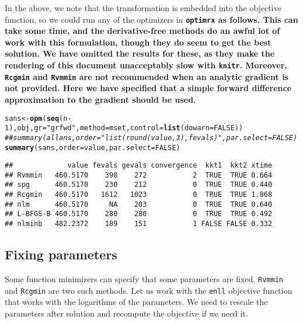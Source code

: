 \documentclass[11pt]{article}\usepackage[]{graphicx}\usepackage[]{color}
\makeatletter
\newcommand{\hlnum}[1]{\textcolor[rgb]{0.686,0.059,0.569}{#1}}%
\newcommand{\hlstr}[1]{\textcolor[rgb]{0.192,0.494,0.8}{#1}}%
\newcommand{\hlcom}[1]{\textcolor[rgb]{0.678,0.584,0.686}{\textit{#1}}}%
\newcommand{\hlopt}[1]{\textcolor[rgb]{0,0,0}{#1}}%
\newcommand{\hlstd}[1]{\textcolor[rgb]{0.345,0.345,0.345}{#1}}%
\newcommand{\hlkwb}[1]{\textcolor[rgb]{0.69,0.353,0.396}{#1}}%
\newcommand{\hlkwc}[1]{\textcolor[rgb]{0.333,0.667,0.333}{#1}}%
\newcommand{\hlkwd}[1]{\textcolor[rgb]{0.737,0.353,0.396}{\textbf{#1}}}%
\newenvironment{kframe}{%
 \def\at@end@of@kframe{}%
 \ifinner\ifhmode%
  \def\at@end@of@kframe{\end{minipage}}%
  \begin{minipage}{\columnwidth}%
 \fi\fi%
 \def\FrameCommand##1{\hskip\@totalleftmargin \hskip-\fboxsep
 \colorbox{shadecolor}{##1}\hskip-\fboxsep
     \hskip-\linewidth \hskip-\@totalleftmargin \hskip\columnwidth}%
 \MakeFramed {\advance\hsize-\width
   \@totalleftmargin\z@ \linewidth\hsize
   \@setminipage}}%
 {\par\unskip\endMakeFramed%
 \at@end@of@kframe}
\newenvironment{knitrout}{}{} %
\newcommand{\code}[1]{{\tt#1}}
\newcommand{\pkg}[1]{\bf{\tt#1}\rm }
\makeatother
\begin{document}
In the above, we note that the transformation is embedded into the objective function, 
so we could run any of the optimizers in \pkg{optimrx} as follows. This can take some time, 
and the derivative-free
methods do an awful lot of work with this formulation, though they do seem to get the
best solution. We have omitted the results for these, as they make the rendering of
this document unacceptably slow with \code{knitr}. Moreover, \code{Rcgmin}
and \code{Rvmmin} are not recommended when an analytic gradient is not provided. Here
we have specified that a simple forward difference approximation to the gradient
should be used. 

\begin{knitrout}\scriptsize
{}\color{fgcolor}\begin{kframe}
\begin{alltt}
\hlstd{sans}\hlkwb{<-} \hlkwd{opm}\hlstd{(}\hlkwd{seq}\hlstd{(n}\hlopt{-}\hlnum{1}\hlstd{), obj,} \hlkwc{gr}\hlstd{=}\hlstr{"grfwd"}\hlstd{,} \hlkwc{method}\hlstd{=mset,} \hlkwc{control}\hlstd{=}\hlkwd{list}\hlstd{(}\hlkwc{dowarn}\hlstd{=}\hlnum{FALSE}\hlstd{))}
\hlcom{## summary(allans, order = "list(round(value, 3), fevals)", par.select = FALSE)}
\hlkwd{summary}\hlstd{(sans,} \hlkwc{order} \hlstd{= value,} \hlkwc{par.select} \hlstd{=} \hlnum{FALSE}\hlstd{)}
\end{alltt}
\begin{verbatim}
##             value fevals gevals convergence  kkt1  kkt2 xtime
## Rvmmin   460.5170    398    272           2  TRUE  TRUE 0.664
## spg      460.5170    230    212           0  TRUE  TRUE 0.440
## Rcgmin   460.5170   1612   1023           0  TRUE  TRUE 1.868
## nlm      460.5170     NA    203           0  TRUE  TRUE 0.640
## L-BFGS-B 460.5170    280    280           0  TRUE  TRUE 0.492
## nlminb   482.2372    189    151           1 FALSE FALSE 0.332
\end{verbatim}
\end{kframe}
\end{knitrout}

\subsection{Fixing parameters}

Some function minimizers can specify that some parameters are fixed. \code{Rvmmin} and
\code{Rcgmin} are two such methods. Let us work with the \code{enll} objective function
that works with the logarithms of the parameters.
We need to rescale the parameters after solution and recompute the objective if we need it.
\end{document}
